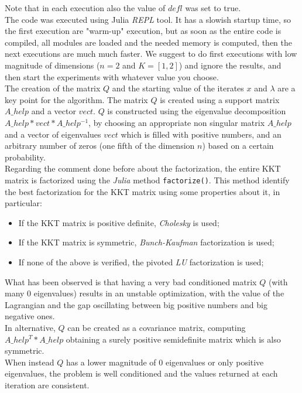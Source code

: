 \documentclass[notitlepage]{article}
\begin{document}
Note that in each execution also the value of $defl$ was set to true.\\
The code was executed using Julia \textit{REPL} tool. It has a slowish startup time, so the first execution are "warm-up" execution, but as soon as the entire code is compiled, all modules are loaded and the needed memory is computed, 
then the next executions are much much faster. We suggest to do first executions with low magnitude of dimensions ($n=2$ and $K=\left[1,2\right]$) and ignore the results, and then start the experiments with whatever value you choose.\\
The creation of the matrix $Q$ and the starting value of the iterates $x$ and $\lambda$ are a key point for the algorithm. The matrix $Q$ is created using a support matrix $A\_help$ and a vector $vect$. $Q$ is 
constructed using the eigenvalue decomposition $A\_help * vect * A\_help^{-1}$, by choosing an appropriate non singular matrix $A\_help$ and a vector of eigenvalues $vect$ which is filled with positive numbers,
and an arbitrary number of zeros (one fifth of the dimension $n$) based on a certain probability.\\
Regarding the comment done before about the factorization, the entire KKT matrix is factorized using the \textit{Julia} method \texttt{factorize()}. This method identify the best factorization for the KKT matrix using some properties about it, 
in particular:
\begin{itemize}
  \item If the KKT matrix is positive definite, \textit{Cholesky} is used;
  \item If the KKT matrix is symmetric, \textit{Bunch-Kaufman} factorization is used;
  \item If none of the above is verified, the pivoted \textit{LU} factorization is used;
\end{itemize} 
What has been observed is that having a very bad conditioned matrix $Q$ (with many $0$ eigenvalues) results in an unstable optimization, with the value of the Lagrangian and the gap oscillating between big positive 
numbers and big negative ones.\\
In alternative, $Q$ can be created as a covariance matrix, computing $A\_help^T * A\_help$ obtaining a surely positive semidefinite matrix which is also symmetric.\\
When instead $Q$ has a lower magnitude of $0$ eigenvalues or only positive eigenvalues, the problem is well conditioned and the values returned at each iteration are consistent.\\
\end{document}
